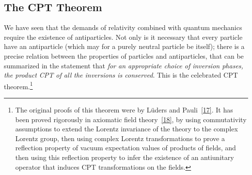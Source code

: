
\subsection{The CPT Theorem}

We have seen that the demands of relativity combined with quantum mechanics
require the existence of antiparticles. Not only is it necessary that every
particle have an antiparticle (which may for a purely neutral particle be
itself); there is a precise relation between the properties of particles and
antiparticles, that can be summarized in the statement that \emph{for an
appropriate choice of inversion phases, the product CPT of all the inversions
is conserved}. This is the celebrated CPT theorem.\footnote{The original
proofs of this theorem were by L\"uders and Pauli~\hyperref[ref:5.17]{[17]}. It has been proved
rigorously in axiomatic field theory~\hyperref[ref:5.18]{[18]}, by using commutativity assumptions
to extend the Lorentz invariance of the theory to the complex Lorentz group,
then using complex Lorentz transformations to prove a reflection property of
vacuum expectation values of products of fields, and then using this
reflection property to infer the existence of an antiunitary operator that
induces CPT transformations on the fields.}

